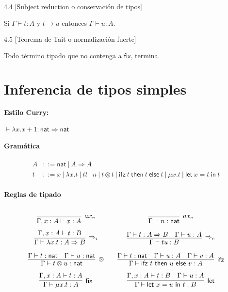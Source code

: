 \documentclass[twoside,a4paper,12pt]{article}
\theoremstyle{definition}
\theoremstyle{remark}
\newcommand\ifz[3]{\ensuremath{\mathsf{ifz~}#1\mathsf{~then~}#2\mathsf{~else~}#3}}
\newcommand\fun[2]{\ensuremath{\lambda {#1}{.}{#2}}}
\newcommand\fix[2]{\ensuremath{\mathsf{\mu}#1.#2}}
\newcommand\letl[3]{\ensuremath{\mathsf{let~}#1=#2\mathsf{~in~}#3}}
\newcommand\nat{\ensuremath{\mathsf{nat}}}
\begin{document}
\begin{teorema}{4.4}
  [Subject reduction o conservación de tipos]
  \label{thm:SR}
  ~

  Si $\Gamma\vdash t:A$ y $t\to u$ entonces $\Gamma\vdash u:A$.
\end{teorema}

\begin{teorema}{4.5}
  [Teorema de Tait o normalización fuerte]
  \label{thm:SN}
  ~

  Todo término tipado que no contenga a $\mathsf{fix}$, termina.
\end{teorema}

\newpage
\section*{Inferencia de tipos simples}

\paragraph{Estilo Curry:} $\vdash\fun x{x+1}:\nat\Rightarrow\nat$

\paragraph{Gramática}
\begin{align*}
  A &::= \nat~|~A\Rightarrow A\\
  t &::= x~|~\fun xt~|~tt~|~n~|~t\otimes t~|~\ifz ttt~|~\fix xt~|~\letl xtt
\end{align*}

\paragraph{Reglas de tipado}
\[\arraycolsep=10pt\def\arraystretch{2.6}
  \begin{array}{cc}
    \infer[ax_v]
    {\Gamma,x:A\vdash x:A}
    {}
    &
      \infer[ax_c]
      {\Gamma\vdash n:\nat}
      {}
    \\
    \infer[\Rightarrow_i]
    {\Gamma\vdash\fun xt:A\Rightarrow B}
    {\Gamma,x:A\vdash t:B}
    &
      \infer[\Rightarrow_e]
      {\Gamma\vdash tu:B}
      {\Gamma\vdash t:A\Rightarrow B & \Gamma\vdash u:A}
    \\
    \infer[\otimes]
    {\Gamma\vdash t\otimes u:\nat}
    {\Gamma\vdash t:\nat & \Gamma\vdash u:\nat}
    &
      \infer[\mathsf{ifz}]
      {\Gamma\vdash\ifz tuv:A}
      {\Gamma\vdash t:\nat & \Gamma\vdash u:A & \Gamma\vdash v:A}
    \\
    \infer[\mathsf{fix}]
    {\Gamma\vdash\fix xt:A}
    {\Gamma,x:A\vdash t:A}
    &
      \infer[\mathsf{let}]
      {\Gamma\vdash\letl xut:B}
      {\Gamma,x:A\vdash t:B & \Gamma\vdash u:A}
  \end{array}
\]
\end{document}
